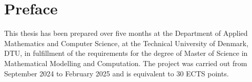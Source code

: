 \chapter*{Preface}
This thesis has been prepared over five months at the Department of Applied Mathematics and Computer Science, at the Technical University of Denmark, DTU, in fulfillment of the requirements for the degree of Master of Science in Mathematical Modelling and Computation.
The project was carried out from September 2024 to February 2025 and is equivalent to 30 ECTS points.

\vfill

\begin{center}
    
    \namesigdate{\thesisauthor~-~\studentnumber}

\end{center}


\vfill


